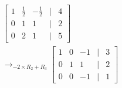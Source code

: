 \documentclass[preview]{standalone}
\begin{document}
\begin{align*}
\begin{bmatrix} 1 & \frac{1}{2} & -\frac{1}{2} & | & 4 \\ 0 & 1 & 1 & | & 2 \\ 0 & 2 & 1 & | & 5 \end{bmatrix}\\ \rightarrow_{-2\times R_2 + R_3} \begin{bmatrix} 1 & 0 & -1 & | & 3 \\ 0 & 1 & 1 & | & 2 \\ 0 & 0 & -1 & | & 1 \end{bmatrix}
\end{align*}
\end{document}
